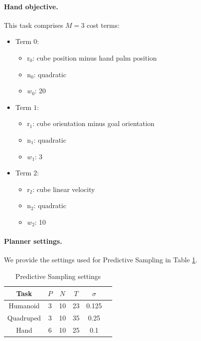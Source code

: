 \paragraph{Hand objective.} \label{ps_obj_hand}
This task comprises $M = 3$ cost terms: 
\begin{itemize}
	\item Term $0$:
	\begin{itemize}
		\item[] $\text{r}_0$: cube position minus hand palm position
		\item[] $\text{n}_0$: quadratic
		\item[] $w_0$: 20
	\end{itemize}
	\item Term $1$:
	\begin{itemize}
		\item[] $\text{r}_1$: cube orientation minus goal orientation
		\item[] $\text{n}_1$: quadratic
		\item[] $w_1$: 3
	\end{itemize}
	\item Term $2$:
	\begin{itemize}
		\item[] $\text{r}_2$: cube linear velocity
		\item[] $\text{n}_2$: quadratic
		\item[] $w_2$: 10
	\end{itemize}
\end{itemize}

\paragraph{Planner settings.}
We provide the settings used for Predictive Sampling in Table \ref{ps_settings}.

\begin{table}[H] 
	\centering
	\caption{Predictive Sampling settings}
	\begin{tabular}{c c c c c c}
		\toprule
		\textbf{Task} & $P$ & $N$ & $T$ & $\sigma$ \\
		\toprule
		Humanoid & 3 & 10 & 23 & 0.125 \\
		Quadruped & 3 & 10 & 35 & 0.25 \\
		Hand & 6 & 10 & 25 & 0.1 \\
		\toprule
	\end{tabular}
	\label{ps_settings}
\end{table}

